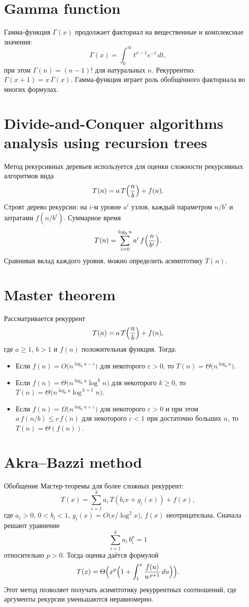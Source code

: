 \documentclass{article}
\begin{document}
	\section{Gamma function}
	Гамма-функция $\Gamma(x)$ продолжает факториал на вещественные и комплексные значения:
	\[
	\Gamma(x) = \int_0^\infty t^{x-1} e^{-t}\,dt,
	\]
	при этом $\Gamma(n)=(n-1)!$ для натуральных $n$. Рекуррентно: $\Gamma(x+1)=x\,\Gamma(x)$. Гамма-функция играет роль обобщённого факториала во многих формулах.
	
	\section{Divide-and-Conquer algorithms analysis using recursion trees}
	Метод рекурсивных деревьев используется для оценки сложности рекурсивных алгоритмов вида 
	\[
	T(n)=a\,T\Bigl(\frac{n}{b}\Bigr) + f(n).
	\]
	Строят дерево рекурсии: на $i$-м уровне $a^i$ узлов, каждый параметром $n/b^i$ и затратами $f(n/b^i)$. Суммарное время 
	\[
	T(n)=\sum_{i=0}^{\log_b n} a^i\,f\Bigl(\frac{n}{b^i}\Bigr).
	\]
	Сравнивая вклад каждого уровня, можно определить асимптотику $T(n)$.
	
	\section{Master theorem}
	Рассматривается рекуррент
	\[
	T(n)=a\,T\Bigl(\frac{n}{b}\Bigr) + f(n),
	\]
	где $a\ge1$, $b>1$ и $f(n)$ положительная функция. Тогда:
	\begin{itemize}
		\item Если $f(n) = O\bigl(n^{\log_b a - \varepsilon}\bigr)$ для некоторого $\varepsilon>0$, то $T(n) = \Theta\bigl(n^{\log_b a}\bigr)$.
		\item Если $f(n) = \Theta\bigl(n^{\log_b a}\log^k n\bigr)$ для некоторого $k\ge0$, то $T(n) = \Theta\bigl(n^{\log_b a}\log^{\,k+1}n\bigr)$.
		\item Если $f(n) = \Omega\bigl(n^{\log_b a + \varepsilon}\bigr)$ для некоторого $\varepsilon>0$ и при этом $a\,f(n/b) \le c\,f(n)$ для некоторого $c<1$ при достаточно больших $n$, то $T(n) = \Theta(f(n))$.
	\end{itemize}
	
	\section{Akra–Bazzi method}
	Обобщение Мастер-теоремы для более сложных рекуррент:
	\[
	T(x) = \sum_{i=1}^k a_i\,T(b_i x + g_i(x)) + f(x),
	\]
	где $a_i>0$, $0<b_i<1$, $g_i(x)=O\bigl(x/\log^2 x\bigr)$, $f(x)$ неотрицательна. Сначала решают уравнение 
	\[
	\sum_{i=1}^k a_i\,b_i^p = 1
	\]
	относительно $p>0$. Тогда оценка даётся формулой
	\[
	T(x) = \Theta\Bigl(x^p\Bigl(1 + \int_1^x \frac{f(u)}{u^{\,p+1}}\,du\Bigr)\Bigr).
	\]
	Этот метод позволяет получать асимптотику рекуррентных соотношений, где аргументы рекурсии уменьшаются неравномерно.
	
	
	
\end{document}
